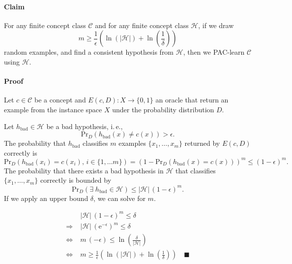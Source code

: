 \paragraph*{Claim}

For any finite concept class $\mathcal{C}$ and for any finite concept
class $\mathcal{H}$, if we draw
\[
m\geq\frac{1}{\epsilon}\left(\ln\left(\vert\mathcal{H}\vert\right)+\ln\left(\frac{1}{\delta}\right)\right)
\]
random examples, and find a consistent hypothesis from $\mathcal{H}$,
then we PAC-learn $\mathcal{C}$ using $\mathcal{H}$.


\paragraph*{Proof}

Let $c\in\mathcal{C}$ be a concept and $E(c,D):X\rightarrow\{0,1\}$
an oracle that return an example from the instance space $X$ under
the probability distribution $D$.

Let $h_{\mathrm{bad}}\in\mathcal{H}$ be a bad hypothesis, i.$\,$e.,
\[
\mathrm{Pr}_{D}(h_{\mathrm{bad}}(x)\neq c(x))>\epsilon.
\]
The probability that $h_{\mathrm{bad}}$ classifies $m$ examples
$\{x_{1},\ldots,x_{m}\}$ returned by $E(c,D)$ correctly is
\[
\mathrm{Pr}_{D}(h_{\mathrm{bad}}(x_{i})=c(x_{i}),\, i\in\{1,\ldots m\})=\left(1-\mathrm{Pr}_{D}(h_{\mathrm{bad}}(x)=c(x))\right)^{m}\leq(1-\epsilon)^{m}.
\]
The probability that there exists a bad hypothesis in $\mathcal{H}$
that classifies $\{x_{1},\ldots,x_{m}\}$ correctly is bounded by
\[
\mathrm{Pr}_{D}(\exists\; h_{\mathrm{bad}}\in\mathcal{H})\leq\vert\mathcal{H}\vert\,(1-\epsilon)^{m}.
\]
If we apply an upper bound $\delta$, we can solve for $m$.

\[
\begin{aligned} & \vert\mathcal{H}\vert\,(1-\epsilon)^{m}\leq\delta\\
\Rightarrow\; & \vert\mathcal{H}\vert\,(\mathrm{e}^{-\epsilon})^{m}\leq\delta\\
\Leftrightarrow\; & m\,(-\epsilon)\leq\ln\left(\frac{\delta}{\vert\mathcal{H}\vert}\right)\\
\Leftrightarrow\; & m\geq\frac{1}{\epsilon}\left(\ln(\vert\mathcal{H}\vert)+\ln\left(\frac{1}{\delta}\right)\right)\quad\blacksquare
\end{aligned}
\]